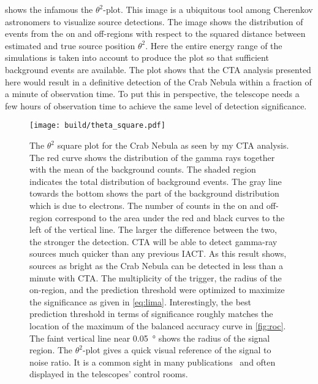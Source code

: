  shows the infamous the $\theta^2$-plot. This image is a ubiquitous tool among Cherenkov astronomers to 
visualize source detections. 
The image shows the distribution of events from the on and off-regions with respect to the squared distance between estimated and true source position $\theta^2$.
Here the entire energy range of the simulations is taken into account to produce the plot so that sufficient background events are available.
The plot shows that the CTA analysis presented here would result in a definitive detection of the Crab Nebula within a fraction of a  minute of observation time.
To put this in perspective, the \fact telescope needs a few hours of observation time to achieve the same level of detection significance.

\begin{figure}
    \centering
    \texttt{[image: build/theta\_square.pdf]}
    \caption[$\theta^2$ square plot for the Crab Nebula]{The $\theta^2$ square plot for the Crab Nebula as seen by my CTA analysis. The red curve shows the distribution of the 
    gamma rays together with the mean of the background counts. The shaded region indicates the total distribution of background events. The gray line towards the bottom 
    shows the part of the background distribution which is due to electrons.
    The number of counts in the on and off-region correspond to the area under the red and black curves to the left of the vertical line. The larger the difference between the two, 
    the stronger the detection.
    CTA will be able to detect gamma-ray sources much quicker than any previous IACT. 
    As this result shows, sources as bright as the Crab Nebula can be detected in less than a minute with CTA. 
    The multiplicity of the trigger, the radius of the on-region, and the prediction threshold were optimized to maximize the significance
    as given in \cref{eq:lima}.
    Interestingly, the best prediction threshold in terms of significance roughly matches the 
    location of the maximum of the balanced accuracy curve in \cref{fig:roc}.
    The faint vertical line near \SI{0.05}{\degree} shows the radius of the signal region. 
    The $\theta^2$-plot gives a quick visual reference of the signal to noise ratio. It is a common
    sight in many publications~\cite{magic_theta_1, magic_theta_2}
    and often displayed in the telescopes' control rooms.
    }
    \label{fig:theta_square}
\end{figure}


